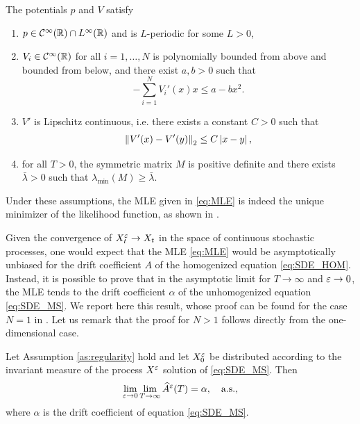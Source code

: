 \documentclass[10pt]{article}
\begin{document}
\begin{assumption}\label{as:regularity} The potentials $p$ and $V$ satisfy
	\begin{enumerate}
		\item $p \in \mathcal C^\infty(\mathbb{R}) \cap L^\infty(\mathbb{R})$ and is $L$-periodic for some $L > 0$,
		\item\label{as:regularity_diss} $V_i \in \mathcal C^\infty(\mathbb{R})$ for all $i=1, \ldots, N$ is polynomially bounded from above and bounded from below, and there exist $a,b > 0$ such that
		\begin{equation}
		-\sum_{i=1}^N V_i'(x)x \leq a - bx^2.
		\end{equation} 
		\item $V'$ is Lipschitz continuous, i.e. there exists a constant $C > 0$ such that
		\begin{equation}
			\left\|V'(x) - V'(y)\right\|_2 \leq C\left\lvert x - y\right\rvert,
		\end{equation} 
		\item for all $T > 0$, the symmetric matrix $M$ is positive definite and there exists $\bar \lambda > 0$ such that $\lambda_{\min}(M) \geq \bar \lambda$.
	\end{enumerate}
\end{assumption}

Under these assumptions, the MLE given in \eqref{eq:MLE} is indeed the unique minimizer of the likelihood function, as shown in \cite[Theorem 2.4]{PSV09}.

Given the convergence of $X^\varepsilon_t \to X_t$ in the space of continuous stochastic processes, one would expect that the MLE \eqref{eq:MLE} would be asymptotically unbiased for the drift coefficient $A$ of the homogenized equation \eqref{eq:SDE_HOM}. Instead, it is possible to prove that in the asymptotic limit for $T \to \infty$ and $\varepsilon \to 0$, the MLE tends to the drift coefficient $\alpha$ of the unhomogenized equation \eqref{eq:SDE_MS}. We report here this result, whose proof can be found for the case $N = 1$ in \cite[Theorem 3.4]{PaS07}. Let us remark that the proof for $N > 1$ follows directly from the one-dimensional case.

\begin{theorem}\label{thm:Bias} Let Assumption \ref{as:regularity} hold and let $X^\varepsilon_0$ be distributed according to the invariant measure of the process $X^\varepsilon$ solution of \eqref{eq:SDE_MS}. Then
	\begin{equation}
		\lim_{\varepsilon \to 0}\lim_{T \to \infty} \widehat A^\varepsilon(T) = \alpha, \quad \text{a.s.},
	\end{equation}
	where $\alpha$ is the drift coefficient of equation \eqref{eq:SDE_MS}.
\end{theorem}
\end{document}
